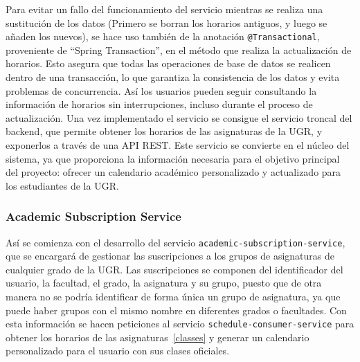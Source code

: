 Para evitar un fallo del funcionamiento del servicio mientras se realiza una sustitución de los datos (Primero se borran los horarios antiguos, y luego se añaden los nuevos), se hace uso también de la anotación \texttt{@Transactional}, proveniente de ``Spring Transaction'', en el método que realiza la actualización de horarios. Esto asegura que todas las operaciones de base de datos se realicen dentro de una transacción, lo que garantiza la consistencia de los datos y evita problemas de concurrencia. Así los usuarios pueden seguir consultando la información de horarios sin  interrupciones, incluso durante el proceso de actualización.
\newline\newline
Una vez implementado el servicio se consigue el servicio troncal del backend, que permite obtener los horarios de las asignaturas de la UGR, y exponerlos a través de una API REST. Este servicio se convierte en el núcleo del sistema, ya que proporciona la información necesaria para el objetivo principal del proyecto: ofrecer un calendario académico personalizado y actualizado para los estudiantes de la UGR.

\subsubsection{Academic Subscription Service}
Así se comienza con el desarrollo del servicio \texttt{academic-subscription-service}, que se encargará de gestionar las suscripciones a los grupos de asignaturas de cualquier grado de la UGR.\newline
Las suscripciones se componen del identificador del usuario, la facultad, el grado, la asignatura y su grupo, puesto que de otra manera no se podría identificar de forma única un grupo de asignatura, ya que puede haber grupos con el mismo nombre en diferentes grados o facultades. Con esta información se hacen peticiones al servicio \texttt{schedule-consumer-service} para obtener los horarios de las asignaturas~\ref{classes} y generar un calendario personalizado para el usuario con sus clases oficiales.\newline

